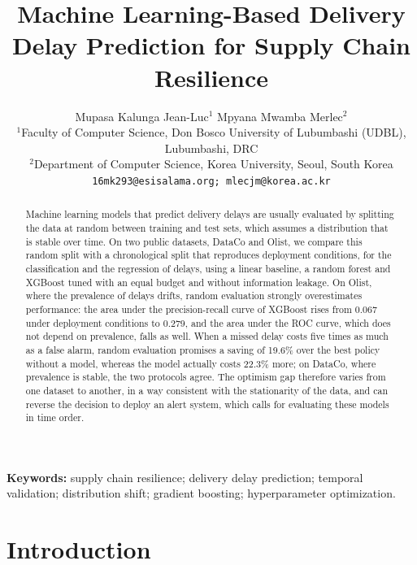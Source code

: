 \documentclass[11pt,a4paper]{article}
\title{\textbf{Machine Learning-Based Delivery Delay Prediction for Supply Chain Resilience}}
\author{%
\begin{tabular}{c}
Mupasa Kalunga Jean-Luc$^{1}$ \qquad Mpyana Mwamba Merlec$^{2}$\\[0.5em]
{\small $^{1}$Faculty of Computer Science, Don Bosco University of Lubumbashi (UDBL), Lubumbashi, DRC}\\
{\small $^{2}$Department of Computer Science, Korea University, Seoul, South Korea}\\[0.3em]
{\small\texttt{16mk293@esisalama.org; mlecjm@korea.ac.kr}}
\end{tabular}%
}
\date{}
\theoremstyle{definition}
\begin{document}
\maketitle

\begin{abstract}
Machine learning models that predict delivery delays are usually evaluated by splitting the data at random between training and test sets, which assumes a distribution that is stable over time. On two public datasets, DataCo and Olist, we compare this random split with a chronological split that reproduces deployment conditions, for the classification and the regression of delays, using a linear baseline, a random forest and XGBoost tuned with an equal budget and without information leakage. On Olist, where the prevalence of delays drifts, random evaluation strongly overestimates performance: the area under the precision-recall curve of XGBoost rises from 0.067 under deployment conditions to 0.279, and the area under the ROC curve, which does not depend on prevalence, falls as well. When a missed delay costs five times as much as a false alarm, random evaluation promises a saving of 19.6\% over the best policy without a model, whereas the model actually costs 22.3\% more; on DataCo, where prevalence is stable, the two protocols agree. The optimism gap therefore varies from one dataset to another, in a way consistent with the stationarity of the data, and can reverse the decision to deploy an alert system, which calls for evaluating these models in time order.
\end{abstract}

\noindent\textbf{Keywords:} supply chain resilience; delivery delay prediction; temporal validation; distribution shift; gradient boosting; hyperparameter optimization.

\section{Introduction}
\label{sec:intro}
\end{document}
